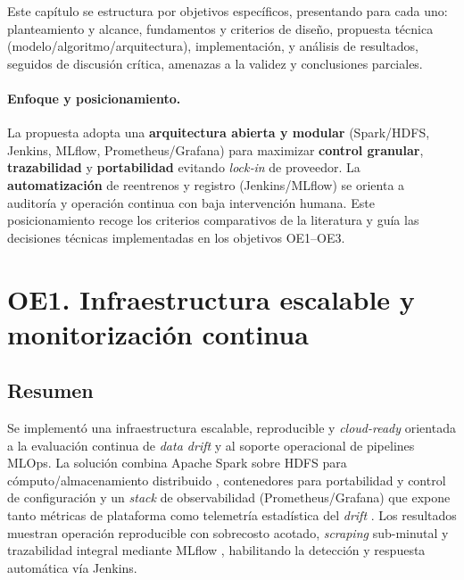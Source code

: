 
Este capítulo se estructura por objetivos específicos, presentando para cada uno: planteamiento y alcance, fundamentos y criterios de diseño, propuesta técnica (modelo/algoritmo/arquitectura), implementación, y análisis de resultados, seguidos de discusión crítica, amenazas a la validez y conclusiones parciales.

\paragraph{Enfoque y posicionamiento.}
La propuesta adopta una \textbf{arquitectura abierta y modular} (Spark/HDFS, Jenkins, MLflow, Prometheus/Grafana) para maximizar \textbf{control granular}, \textbf{trazabilidad} y \textbf{portabilidad} evitando \textit{lock‑in} de proveedor. La \textbf{automatización} de reentrenos y registro (Jenkins/MLflow) se orienta a auditoría y operación continua con baja intervención humana. Este posicionamiento recoge los criterios comparativos de la literatura y guía las decisiones técnicas implementadas en los objetivos OE1–OE3.

\section{OE1. Infraestructura escalable y monitorización continua}
\label{sec:oe1}

\subsection*{Resumen}
Se implementó una infraestructura escalable, reproducible y \textit{cloud-ready} orientada a la evaluación continua de \textit{data drift} y al soporte operacional de pipelines MLOps. La solución combina Apache Spark sobre HDFS para cómputo/almacenamiento distribuido \citep{Zaharia2016,Meng2020}, contenedores para portabilidad y control de configuración \citep{Merkel2014,Patel2020} y un \textit{stack} de observabilidad (Prometheus/Grafana) que expone tanto métricas de plataforma como telemetría estadística del \textit{drift} \citep{Zhao2021}. Los resultados muestran operación reproducible con sobrecosto acotado, \textit{scraping} sub-minutal y trazabilidad integral mediante MLflow \citep{Chen2022}, habilitando la detección y respuesta automática vía Jenkins.

